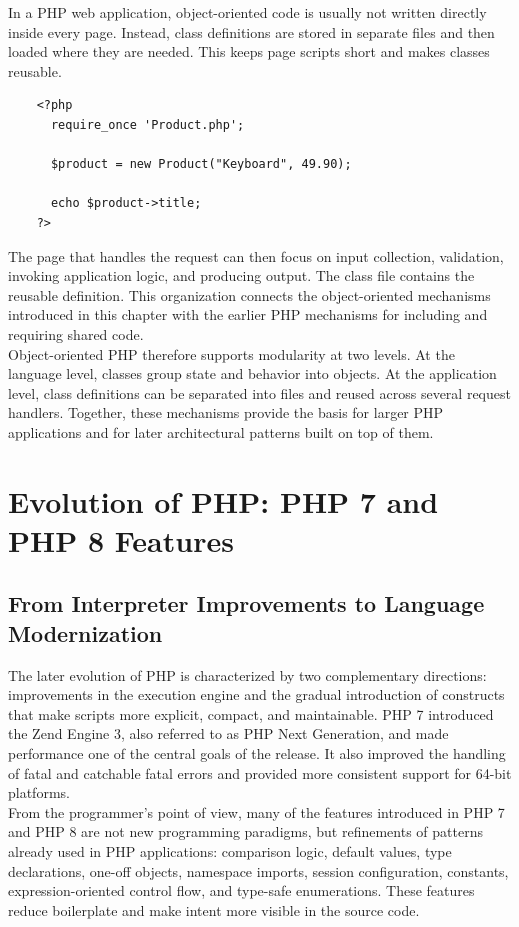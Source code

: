 \documentclass{scrbook}
\begin{document}
	In a PHP web application, object-oriented code is usually not written directly inside every page. Instead, class definitions are stored in separate files and then loaded where they are needed. This keeps page scripts short and makes classes reusable.
	
	\begin{lstlisting}
	<?php
	  require_once 'Product.php';
	
	  $product = new Product("Keyboard", 49.90);
	
	  echo $product->title;
	?>
	\end{lstlisting}
	
	The page that handles the request can then focus on input collection, validation, invoking application logic, and producing output. The class file contains the reusable definition. This organization connects the object-oriented mechanisms introduced in this chapter with the earlier PHP mechanisms for including and requiring shared code.\\
	
	Object-oriented PHP therefore supports modularity at two levels. At the language level, classes group state and behavior into objects. At the application level, class definitions can be separated into files and reused across several request handlers. Together, these mechanisms provide the basis for larger PHP applications and for later architectural patterns built on top of them.
	
	\chapter{Evolution of PHP: PHP 7 and PHP 8 Features}
	
	\section{From Interpreter Improvements to Language Modernization}
	
	The later evolution of PHP is characterized by two complementary directions: improvements in the execution engine and the gradual introduction of constructs that make scripts more explicit, compact, and maintainable. PHP 7 introduced the Zend Engine 3, also referred to as PHP Next Generation, and made performance one of the central goals of the release. It also improved the handling of fatal and catchable fatal errors and provided more consistent support for 64-bit platforms.\\
	
	From the programmer's point of view, many of the features introduced in PHP 7 and PHP 8 are not new programming paradigms, but refinements of patterns already used in PHP applications: comparison logic, default values, type declarations, one-off objects, namespace imports, session configuration, constants, expression-oriented control flow, and type-safe enumerations. These features reduce boilerplate and make intent more visible in the source code.
	
\end{document}
